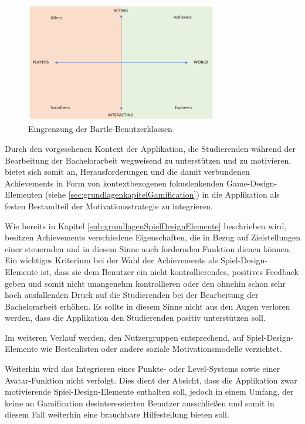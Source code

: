 \documentclass[bibliography=totoc,listof=totoc,BCOR=5mm,DIV=12,oneside]{scrbook}
\begin{document}
\bigskip

\begin{figure}[H]
	\centering
	\includegraphics[width=0.75\textwidth, keepaspectratio]{Bilder/Diagramme/InterestGraphBartleAchieversExplorers.png}
	\caption{Eingrenzung der Bartle-Benutzerklassen}
	\label{img:interestGraphBartleAchiversExplorers}
\end{figure}

\par Durch den vorgesehenen Kontext der Applikation, die Studierenden während der Bearbeitung der Bachelorarbeit wegweisend zu unterstützen und zu motivieren, bietet sich somit an, Herausforderungen und die damit verbundenen Achievements in Form von kontextbezogenen fokuslenkenden Game-Design-Elementen (siehe \ref{sec:grundlagenkapitelGamification}) in die Applikation als festen Bestandteil der Motivationsstrategie zu integrieren.

\par\medskip Wie bereits in Kapitel \ref{sub:grundlagenSpielDesignElemente} beschrieben wird, besitzen Achievements verschiedene Eigenschaften, die in Bezug auf Zielstellungen einer steuernden und in diesem Sinne auch fordernden Funktion dienen können. Ein wichtiges Kriterium bei der Wahl der Achievements als Spiel-Design-Elemente ist, dass sie dem Benutzer ein nicht-kontrollierendes, positives Feedback geben und somit nicht unangenehm kontrollieren oder den ohnehin schon sehr hoch ausfallenden Druck auf die Studierenden bei der Bearbeitung der Bachelorarbeit erhöhen. Es sollte in diesem Sinne nicht aus den Augen verloren werden, dass die Applikation den Studierenden positiv unterstützen soll.

\par\medskip Im weiteren Verlauf werden, den Nutzergruppen entsprechend, auf Spiel-Design-Elemente wie Bestenlisten oder andere soziale Motivationsmodelle verzichtet.

\par Weiterhin wird das Integrieren eines Punkte- oder Level-Systems sowie einer Avatar-Funktion nicht verfolgt. Dies dient der Absicht, dass die Applikation zwar motivierende Spiel-Design-Elemente enthalten soll, jedoch in einem Umfang, der keine an Gamification desinteressierten Benutzer ausschließen und somit in diesem Fall weiterhin eine brauchbare Hilfestellung bieten soll.
\end{document}

